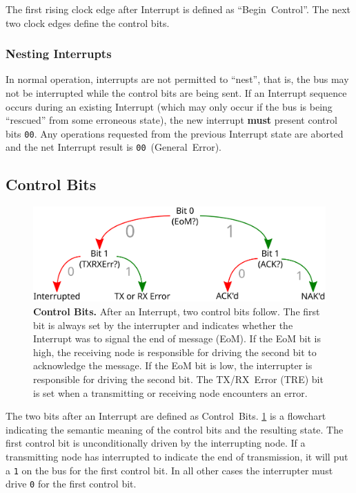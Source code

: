 The first rising clock edge after Interrupt is defined as ``Begin~Control''.
The next two clock edges define the control bits.

\subsubsection{Nesting Interrupts}
In normal operation, interrupts are not permitted to ``nest'', that is, the
bus may not be interrupted while the control bits are being sent. If an
Interrupt sequence occurs during an existing Interrupt (which may only occur
if the bus is being ``rescued'' from some erroneous state), the new interrupt
{\bf must} present control bits {\tt 00}. Any operations requested from the
previous Interrupt state are aborted and the net Interrupt result is
{\tt 00}~(General~Error).

\subsection{Control Bits}
\label{sec:protocol-control}

\begin{figure}
  \includegraphics[width=\linewidth]{img/control_bits}
  \caption{\textbf{Control Bits.} \textmd{
      After an Interrupt, two control bits follow. The first bit is always set
      by the interrupter and indicates whether the Interrupt was to signal the
      end of message (EoM). If the EoM bit is high, the receiving node is
      responsible for driving the second bit to acknowledge the message.  If
      the EoM bit is low, the interrupter is responsible for driving the
      second bit. The TX/RX~Error (TRE) bit is set when a transmitting or
      receiving node encounters an error.
  }}
  \label{fig:control-bits}
\end{figure}

The two bits after an Interrupt are defined as Control~Bits.
\cref{fig:control-bits} is a flowchart indicating the semantic meaning
of the control bits and the resulting state. The first control bit is
unconditionally driven by the interrupting node. If a transmitting node has
interrupted to indicate the end of transmission, it will put a {\tt 1} on the
bus for the first control bit. In all other cases the interrupter must drive
{\tt 0} for the first control bit.

